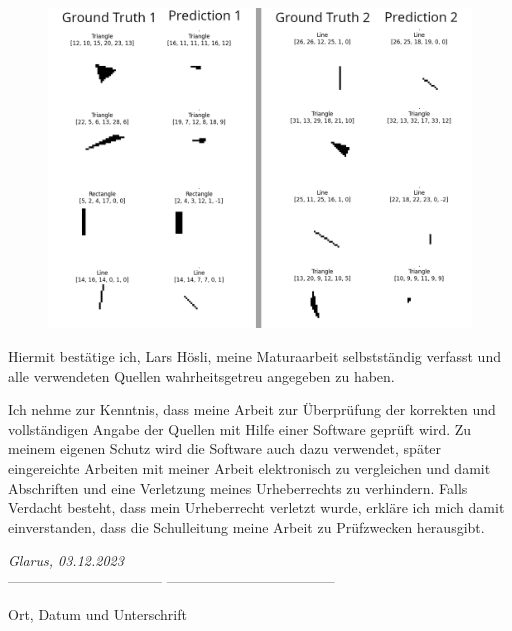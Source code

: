 \documentclass[12pt, a4paper, titlepage]{report}
\begin{document}
\begin{figure}[H]
   \includegraphics[width=1.0\textwidth]{../rc/images/all_shapes_approx_visual3_condensed.png}
   \label{fig:results_demonstration3_condensed}
\end{figure}




\pagebreak

Hiermit bestätige ich, Lars Hösli, meine Maturaarbeit selbstständig verfasst
und alle verwendeten Quellen wahrheitsgetreu angegeben zu haben.

Ich nehme zur Kenntnis, dass meine Arbeit zur Überprüfung der korrekten und
vollständigen Angabe der Quellen mit Hilfe einer Software geprüft wird. Zu meinem
eigenen Schutz wird die Software auch dazu verwendet, später eingereichte Arbeiten mit meiner Arbeit elektronisch zu vergleichen und damit Abschriften und
eine Verletzung meines Urheberrechts zu verhindern. Falls Verdacht besteht, dass
mein Urheberrecht verletzt wurde, erkläre ich mich damit einverstanden, dass die
Schulleitung meine Arbeit zu Prüfzwecken herausgibt.

\vspace{2.0cm}
\emph{Glarus, 03.12.2023}\\
--------------------------------- ------------------------------------

Ort, Datum und Unterschrift

\end{document}
